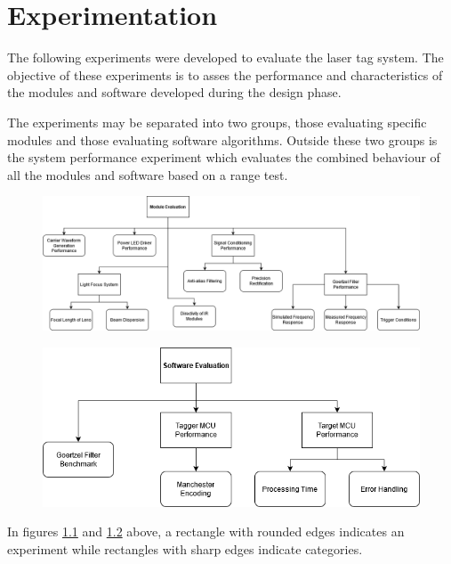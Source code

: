 \chapter{Experimentation}
\label{ch_experimentation}
The following experiments were developed to evaluate the laser tag system. The objective of these experiments is to asses the performance and characteristics of the modules and software developed during the design phase.

The experiments may be separated into two groups, those evaluating specific modules and those evaluating software algorithms. Outside these two groups is the system performance experiment which evaluates the combined behaviour of all the modules and software based on a range test.

\begin{figure}[H]
	\centering
	\includegraphics[width=\linewidth]{figures/experimentation/experiments_overview_module_evaluation.png}
	\label{fig:experiments_overview_module_evaluation}
\end{figure}

\begin{figure}[H]
	\centering
	\includegraphics[width=.7\linewidth]{figures/experimentation/experiments_overview_software_evaluation.png}
	\label{fig:experiments_overview_software_evaluation}
\end{figure}

In figures \ref{fig:experiments_overview_module_evaluation} and \ref{fig:experiments_overview_software_evaluation} above, a rectangle with rounded edges indicates an experiment while rectangles with sharp edges indicate categories.




